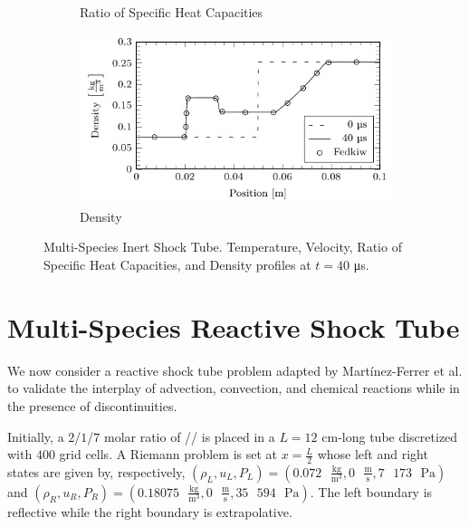 \begin{figure}
\begin{subfigure}[b]{0.5\textwidth}
        \caption{Ratio of Specific Heat Capacities}
    \end{subfigure}
    \begin{subfigure}[b]{0.5\textwidth}
        \centering
        \includegraphics[width=\textwidth]{figures/1D_inert_shocktube/rho.pdf}
        \caption{Density}
    \end{subfigure}
    \caption{Multi-Species Inert Shock Tube. Temperature, Velocity, Ratio of Specific Heat Capacities, and Density profiles at $t=40$ \si{\micro\second}.}
    \label{fig:1D_inert_shocktube}
\end{figure}

\section{Multi-Species Reactive Shock Tube}
\label{sec:1d_reactive_shocktube}

We now consider a reactive shock tube problem adapted by Martínez-Ferrer et al.
\cite{MARTINEZFERRER201488} to validate the interplay of advection, convection,
and chemical reactions while in the presence of discontinuities.

Initially, a $2$/$1$/$7$ molar ratio of // is placed in a
$L=12$ \si{\centi\meter}-long tube discretized with $400$ grid cells. A Riemann
problem is set at $x=\frac{L}{2}$ whose left and right states are given by,
respectively,
$\left(\rho_L,u_L,P_L\right) = \left(0.072\text{ }\frac{\si{\kilogram}}{\si{\meter}^3},0\text{ }\frac{\si{\meter}}{\si{\second}}, 7\text{ }173\text{ }\si{\pascal}\right)$
and
$\left(\rho_R,u_R,P_R\right) = \left(0.18075\text{ }\frac{\si{\kilogram}}{\si{\meter}^3},0\text{ }\frac{\si{\meter}}{\si{\second}}, 35\text{ }594\text{ }\si{\pascal}\right)$.
The left boundary is reflective while the right boundary is extrapolative.

